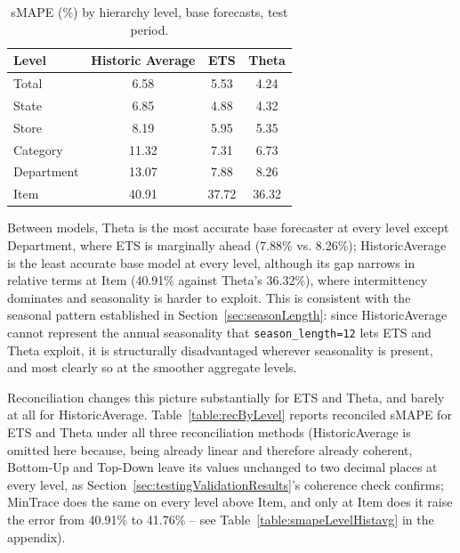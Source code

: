 \begin{table}[htbp]
	\centering
	\caption{sMAPE (\%) by hierarchy level, base forecasts, test period.}
	\label{table:baseByLevel}
	\begin{tabular}{
			l
			S[table-format=2.2]
			S[table-format=2.2]
			S[table-format=2.2]
		}
		\toprule
		\textbf{Level} & {\textbf{Historic Average}} & {\textbf{ETS}} & {\textbf{Theta}} \\
		\midrule
		Total      &  6.58 &  5.53 &  4.24 \\
		State      &  6.85 &  4.88 &  4.32 \\
		Store      &  8.19 &  5.95 &  5.35 \\
		Category   & 11.32 &  7.31 &  6.73 \\
		Department & 13.07 &  7.88 &  8.26 \\
		Item       & 40.91 & 37.72 & 36.32 \\
		\bottomrule
	\end{tabular}
\end{table}

Between models, Theta is the most accurate base forecaster at every level except Department, where ETS is marginally ahead (7.88\% vs. 8.26\%); HistoricAverage is the least accurate base model at every level, although its gap narrows in relative terms at Item (40.91\% against Theta's 36.32\%), where intermittency dominates and seasonality is harder to exploit. This is consistent with the seasonal pattern established in Section~\ref{sec:seasonLength}: since HistoricAverage cannot represent the annual seasonality that \texttt{season\_length=12} lets ETS and Theta exploit, it is structurally disadvantaged wherever seasonality is present, and most clearly so at the smoother aggregate levels.

Reconciliation changes this picture substantially for ETS and Theta, and barely at all for HistoricAverage. Table~\ref{table:recByLevel} reports reconciled sMAPE for ETS and Theta under all three reconciliation methods (HistoricAverage is omitted here because, being already linear and therefore already coherent, Bottom-Up and Top-Down leave its values unchanged to two decimal places at every level, as Section~\ref{sec:testingValidationResults}'s coherence check confirms; MinTrace does the same on every level above Item, and only at Item does it raise the error from 40.91\% to 41.76\% -- see Table~\ref{table:smapeLevelHistavg} in the appendix).

